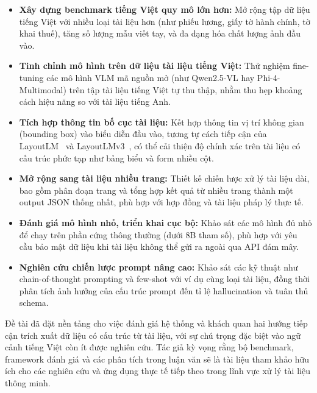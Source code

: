 ﻿\documentclass[12pt]{report}
\begin{document}
\begin{itemize}
    \item \textbf{Xây dựng benchmark tiếng Việt quy mô lớn hơn:} Mở rộng tập dữ liệu tiếng Việt với nhiều loại tài liệu hơn (như phiếu lương, giấy tờ hành chính, tờ khai thuế), tăng số lượng mẫu viết tay, và đa dạng hóa chất lượng ảnh đầu vào.

    \item \textbf{Tinh chỉnh mô hình trên dữ liệu tài liệu tiếng Việt:} Thử nghiệm fine-tuning các mô hình VLM mã nguồn mở (như Qwen2.5-VL hay Phi-4-Multimodal) trên tập tài liệu tiếng Việt tự thu thập, nhằm thu hẹp khoảng cách hiệu năng so với tài liệu tiếng Anh.

    \item \textbf{Tích hợp thông tin bố cục tài liệu:} Kết hợp thông tin vị trí không gian (bounding box) vào biểu diễn đầu vào, tương tự cách tiếp cận của LayoutLM~\cite{xu2020layoutlm} và LayoutLMv3~\cite{huang2022layoutlmv3}, có thể cải thiện độ chính xác trên tài liệu có cấu trúc phức tạp như bảng biểu và form nhiều cột.

    \item \textbf{Mở rộng sang tài liệu nhiều trang:} Thiết kế chiến lược xử lý tài liệu dài, bao gồm phân đoạn trang và tổng hợp kết quả từ nhiều trang thành một output JSON thống nhất, phù hợp với hợp đồng và tài liệu pháp lý thực tế.

    \item \textbf{Đánh giá mô hình nhỏ, triển khai cục bộ:} Khảo sát các mô hình đủ nhỏ để chạy trên phần cứng thông thường (dưới 8B tham số), phù hợp với yêu cầu bảo mật dữ liệu khi tài liệu không thể gửi ra ngoài qua API đám mây.

    \item \textbf{Nghiên cứu chiến lược prompt nâng cao:} Khảo sát các kỹ thuật như chain-of-thought prompting và few-shot với ví dụ cùng loại tài liệu, đồng thời phân tích ảnh hưởng của cấu trúc prompt đến tỉ lệ hallucination và tuân thủ schema.
\end{itemize}

Đề tài đã đặt nền tảng cho việc đánh giá hệ thống và khách quan hai hướng tiếp cận trích xuất dữ liệu có cấu trúc từ tài liệu, với sự chú trọng đặc biệt vào ngữ cảnh tiếng Việt còn ít được nghiên cứu. Tác giả kỳ vọng rằng bộ benchmark, framework đánh giá và các phân tích trong luận văn sẽ là tài liệu tham khảo hữu ích cho các nghiên cứu và ứng dụng thực tế tiếp theo trong lĩnh vực xử lý tài liệu thông minh.


\renewcommand{\bibname}{Danh sách tham khảo}


\end{document}
